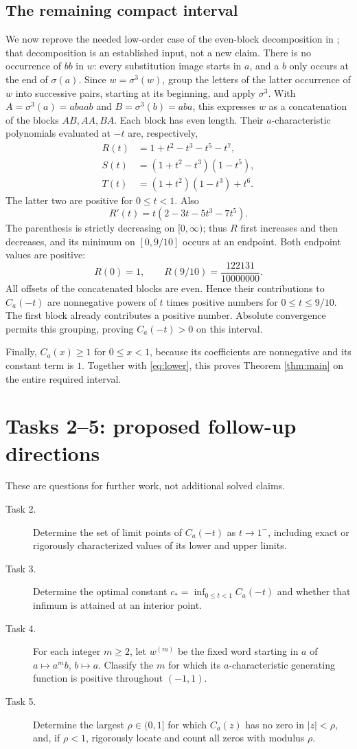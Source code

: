 \documentclass[11pt]{article}
\begin{document}
\subsection*{The remaining compact interval}
We now reprove the needed low-order case of the even-block
decomposition in \cite[Section 5]{PRS}; that decomposition is an
established input, not a new claim.
There is no occurrence of $bb$ in $w$: every substitution image starts
in $a$, and a $b$ only occurs at the end of $\sigma(a)$.
Since $w=\sigma^3(w)$, group the letters of the latter occurrence of
$w$ into successive pairs, starting at its beginning, and apply
$\sigma^3$. With $A=\sigma^3(a)=abaab$ and $B=\sigma^3(b)=aba$,
this expresses $w$ as a concatenation of the blocks $AB,AA,BA$.
Each block has even length. Their $a$-characteristic polynomials
evaluated at $-t$ are, respectively,
\begin{align*}
 R(t)&=1+t^2-t^3-t^5-t^7,\\
 S(t)&=(1+t^2-t^3)(1-t^5),\\
 T(t)&=(1+t^2)(1-t^3)+t^6.
\end{align*}
The latter two are positive for $0\leq t<1$. Also
\[
 R'(t)=t(2-3t-5t^3-7t^5).
\]
The parenthesis is strictly decreasing on $[0,\infty)$; thus $R$
first increases and then decreases, and its minimum on $[0,9/10]$
occurs at an endpoint. Both endpoint values are positive:
\[
 R(0)=1,\qquad R(9/10)=\frac{122131}{10000000}.
\]
All offsets of the concatenated blocks are even. Hence their
contributions to $C_a(-t)$ are nonnegative powers of $t$ times
positive numbers for $0\leq t\leq9/10$. The first block already
contributes a positive number. Absolute convergence permits this
grouping, proving $C_a(-t)>0$ on this interval.

Finally, $C_a(x)\geq1$ for $0\leq x<1$, because its coefficients
are nonnegative and its constant term is $1$.
Together with \eqref{eq:lower}, this proves Theorem \ref{thm:main}
on the entire required interval.

\section*{Tasks 2--5: proposed follow-up directions}
These are questions for further work, not additional solved claims.
\begin{description}
\item[Task 2.] Determine the set of limit points of $C_a(-t)$ as
$t\to1^-$, including exact or rigorously characterized values of
its lower and upper limits.
\item[Task 3.] Determine the optimal constant
$c_*=\inf_{0\leq t<1}C_a(-t)$ and whether that infimum is attained
at an interior point.
\item[Task 4.] For each integer $m\geq2$, let $w^{(m)}$ be the fixed
word starting in $a$ of $a\mapsto a^mb$, $b\mapsto a$.
Classify the $m$ for which its $a$-characteristic generating
function is positive throughout $(-1,1)$.
\item[Task 5.] Determine the largest $\rho\in(0,1]$ for which
$C_a(z)$ has no zero in $|z|<\rho$, and, if $\rho<1$, rigorously
locate and count all zeros with modulus $\rho$.
\end{description}
\end{document}
